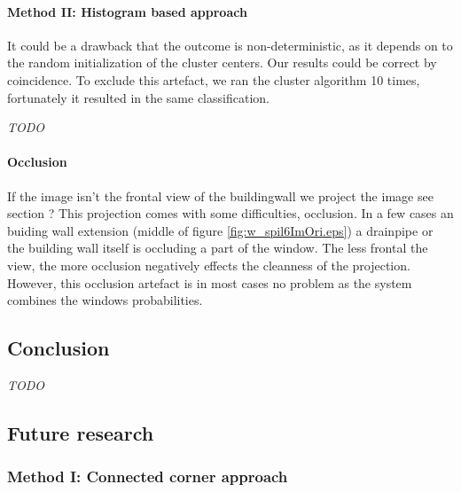 \paragraph{Method II: Histogram based approach} 



It could be a drawback that the outcome is non-deterministic, as it depends on to the
random initialization of the cluster centers. Our results could be correct by
coincidence.  To exclude this artefact, we ran the cluster algorithm 10 times,
fortunately it resulted in the same classification.


\emph{TODO}\\

\paragraph{Occlusion}
\label{lab:occlusion}
If the image isn't the frontal view of the buildingwall we project the image 
see section ?%
This projection comes with some difficulties, occlusion.  In a few cases an
buiding wall extension (middle of figure \ref{fig:w_spil6ImOri.eps}) a drainpipe
or the building wall itself is occluding a part of the window.  The less frontal
the view, the more occlusion negatively effects the cleanness of the projection.
However, this occlusion artefact is in most cases no problem as the system
combines the windows probabilities.  

\subsection{Conclusion}
\emph{TODO}

\subsection{Future research}
\subsubsection{Method I: Connected corner approach} 

